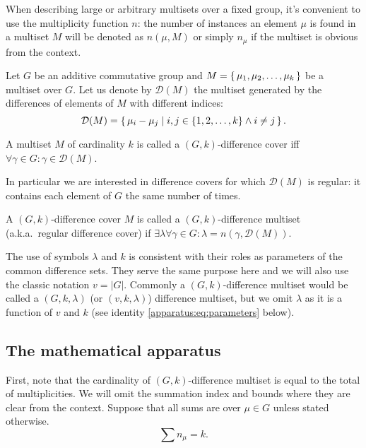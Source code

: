 When describing large or arbitrary multisets over a fixed group, it's convenient to use the multiplicity function $n$: the number of instances an element $\mu$ is found in a multiset $M$ will be denoted as $n(\mu,M)$ or simply $n_\mu$ if the multiset is obvious from the context.

Let $G$ be an additive commutative group and $M=\set{\mu_1, \mu_2, \ldots, \mu_k}$ be a multiset over $G$. Let us denote by $\mathcal D(M)$ the multiset generated by the differences of elements of $M$ with different indices: 
\begin{equation}
    \mathcal D (M) = \set{\mu_i-\mu_j \mid i, j \in \{1,2,\ldots,k\} \land i \neq j}.
\end{equation}

\begin{definition}
    \label{dms:def:dc}
    A multiset $M$ of cardinality $k$ is called a $(G,k)$-difference cover iff $\forall \gamma \in G \colon \gamma \in \mathcal D(M)$.
\end{definition}

In particular we are interested in difference covers 
for which $\mathcal D(M)$ is regular: it contains each element of $G$ the same number of times.

\begin{definition}
    \label{dms:def:dms}
    A $(G,k)$-difference cover $M$ is called a $(G,k)$-difference multiset (a.k.a.\ regular difference cover) if $\exists \lambda  \forall \gamma \in G \colon \lambda = n(\gamma, \mathcal D(M))$.
\end{definition}

The use of symbols $\lambda$ and $k$ is consistent with their roles as parameters of the common difference sets. They serve the same purpose here and we will also use the classic notation $v = |G|$. Commonly a $(G,k)$-difference multiset would be called a $(G,k,\lambda)$ (or $(v,k,\lambda)$) difference multiset, but we omit $\lambda$ as it is a function of $v$ and $k$ 
(see identity \eqref{apparatus:eq:parameters} below).


\subsection{The mathematical apparatus}
    \label{sec:apparatus}
    First, note that the cardinality of $(G,k)$-difference multiset is equal to the total of multiplicities. We will omit the summation index and bounds where they are clear from the context. Suppose that all sums are over $\mu \in G$ unless stated otherwise.
    \begin{equation}
        \label{apparatus:eq:ni}
        \sum {n_\mu} = k.
    \end{equation}
    
